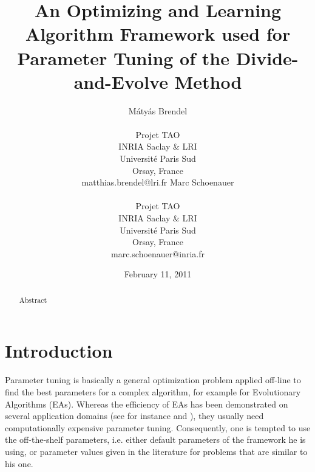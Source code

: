 \documentclass{article}
\begin{document}
\title{An Optimizing and Learning Algorithm Framework used for Parameter Tuning of the Divide-and-Evolve Method}


\author{M{\'a}ty{\'a}s Brendel \\ \\ Projet TAO \\ INRIA Saclay \& LRI\\ Universit{\'e} Paris Sud \\ Orsay, France\\ matthias.brendel@lri.fr   
\And Marc Schoenauer \\ \\ Projet TAO \\ INRIA Saclay \& LRI\\ Universit{\'e} Paris Sud \\ Orsay, France\\ marc.schoenauer@inria.fr}





\date{February 11, 2011}
\maketitle
\begin{abstract}
\noindent Abstract
\end{abstract}
\section{Introduction}

Parameter tuning is basically a general optimization problem applied off-line to find the best parameters for a complex algorithm, for example for Evolutionary Algorithms (EAs). Whereas the efficiency of EAs has been demonstrated on several application domains (see for instance \cite{practice08} and \cite{ParameterSettingBook07}), they usually need computationally expensive parameter tuning. Consequently, one is tempted to use the off-the-shelf parameters, i.e. either default parameters of the framework he is using, or parameter values given in the literature for problems that are similar to his one. 
\end{document}
